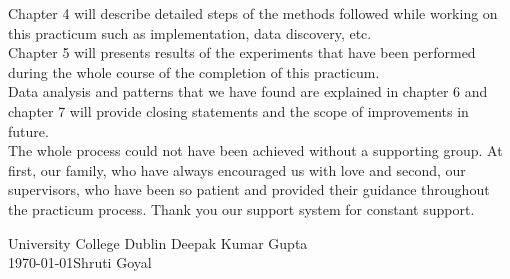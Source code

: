Chapter 4 will describe detailed steps of the methods followed while working on this practicum such as implementation, data discovery, etc.\\

Chapter 5 will presents results of the experiments that have been performed during the whole course of the completion of this practicum.\\

Data analysis and patterns that we have found are explained in chapter 6 and chapter 7 will provide closing statements and the scope of improvements in future.\\

The whole process could not have been achieved without a supporting group. At first, our family, who have always encouraged us with love and second, our supervisors, who have been so patient and provided their guidance throughout the practicum process. Thank you our support system for constant support.


\vspace{2em}
University College Dublin \hfill Deepak Kumar Gupta \\
\today \hfill Shruti Goyal
